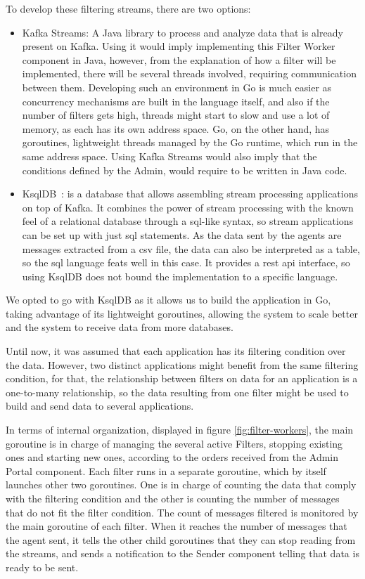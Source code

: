 To develop these filtering streams, there are two options:
\begin{itemize}
    \item Kafka Streams: A Java library to process and analyze data that is already present on Kafka.
        Using it would imply implementing this Filter Worker component in Java, however, from the explanation of how a filter will be implemented, there will be several threads involved, requiring communication between them.
        Developing such an environment in Go is much easier as concurrency mechanisms are built in the language itself, and also if the number of filters gets high, threads might start to slow and use a lot of memory, as each has its own address space.
        Go, on the other hand, has goroutines, lightweight threads managed by the Go runtime, which run in the same address space.
        Using Kafka Streams would also imply that the conditions defined by the Admin, would require to be written in Java code.
    \item KsqlDB~\cite{ksql}: is a database that allows assembling stream processing applications on top of Kafka.
        It combines the power of stream processing with the known feel of a relational database through a \gls{sql}-like syntax, so stream applications can be set up with just \gls{sql} statements.
        As the data sent by the agents are messages extracted from a \gls{csv} file, the data can also be interpreted as a table, so the \gls{sql} language feats well in this case.
        It provides a \gls{rest} \gls{api} interface, so using KsqlDB does not bound the implementation to a specific language.
\end{itemize}

We opted to go with KsqlDB as it allows us to build the application in Go, taking advantage of its lightweight goroutines, allowing the system to scale better and the system to receive data from more databases.

Until now, it was assumed that each application has its filtering condition over the data.
However, two distinct applications might benefit from the same filtering condition, for that, the relationship between filters on data for an application is a one-to-many relationship, so the data resulting from one filter might be used to build and send data to several applications.

In terms of internal organization, displayed in figure \ref{fig:filter-workers}, the main goroutine is in charge of managing the several active Filters, stopping existing ones and starting new ones, according to the orders received from the Admin Portal component.
Each filter runs in a separate goroutine, which by itself launches other two goroutines.
One is in charge of counting the data that comply with the filtering condition and the other is counting the number of messages that do not fit the filter condition.
The count of messages filtered is monitored by the main goroutine of each filter.
When it reaches the number of messages that the agent sent, it tells the other child goroutines that they can stop reading from the streams, and sends a notification to the Sender component telling that data is ready to be sent.


